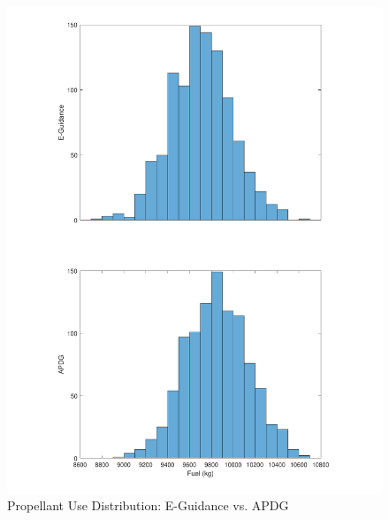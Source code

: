 \begin{figure}[H]
	\centering
	\begin{minipage}{4.3 in}
		\includegraphics[width=\linewidth]{Figures/hfuelEvsAPDG.pdf}
		\caption{Propellant Use Distribution: E-Guidance vs. APDG \label{fig:hfuelEvsAPDG} }
	\end{minipage}
\end{figure}



